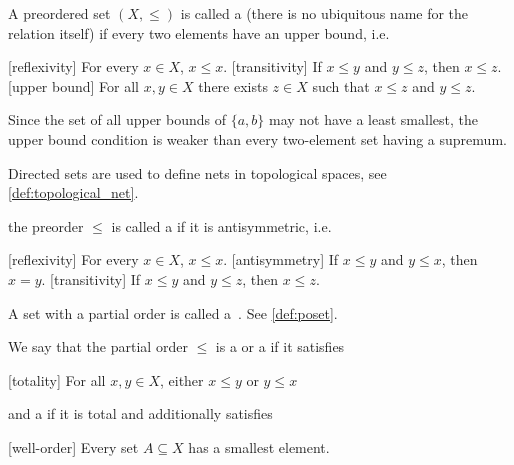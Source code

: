 \begin{definition}
\begin{defenum}
    \cite[8]{Engelking1989} A preordered set \( (X, \leq) \) is called a  (there is no ubiquitous name for the relation itself) if every two elements have an upper bound, i.e.
    \begin{description}
      [reflexivity] For every \( x \in X \), \( x \leq x \).
      [transitivity] If \( x \leq y \) and \( y \leq z \), then \( x \leq z \).
      [upper bound] For all \( x, y \in X \) there exists \( z \in X \) such that \( x \leq z \) and \( y \leq z \).
    \end{description}

    Since the set of all upper bounds of \( \{ a, b \} \) may not have a least smallest, the upper bound condition is weaker than every two-element set having a supremum.

    Directed sets are used to define nets in topological spaces, see \cref{def:topological_net}.

    \cite[7]{Engelking1989} the preorder \( \leq \) is called a  if it is antisymmetric, i.e.
    \begin{description}
      [reflexivity] For every \( x \in X \), \( x \leq x \).
      [antisymmetry] If \( x \leq y \) and \( y \leq x \), then \( x = y \).
      [transitivity] If \( x \leq y \) and \( y \leq z \), then \( x \leq z \).
    \end{description}

    A set with a partial order is called a~. See \cref{def:poset}.

    We say that the partial order \( \leq \) is a  or a  if it satisfies
    \begin{description}
      [totality] For all \( x, y \in X \), either \( x \leq y \) or \( y \leq x \)
    \end{description}
    and a  if it is total and additionally satisfies
    \begin{description}
      [well-order] Every set \( A \subseteq X \) has a smallest element.
    \end{description}


\end{defenum}
\end{definition}
